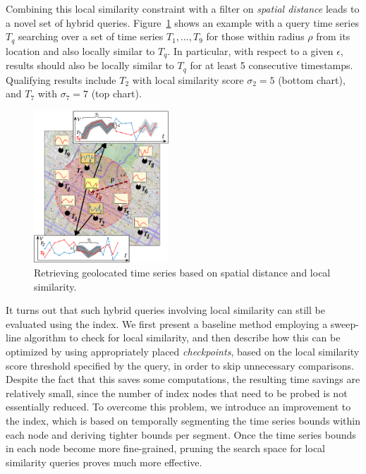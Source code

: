 Combining this local similarity constraint with a filter on {\em spatial distance} leads to a novel set of hybrid queries. Figure~\ref{fig:example_query} shows an example with a query time series $T_q$ searching over a set of time series $T_1,\dots,T_9$ for those within radius $\rho$ from its location and also locally similar to $T_q$. In particular, with respect to a given $\epsilon$, results should also be locally similar to $T_q$ for at least 5 consecutive timestamps. Qualifying results include $T_2$ with local similarity score $\sigma_2 = 5$ (bottom chart), and $T_7$ with $\sigma_7 = 7$ (top chart).

\begin{figure}[!tb]
 \centering
 \includegraphics[width=0.45\textwidth]{Figures/local_sim_geoloc.png}
\caption{Retrieving geolocated time series based on spatial distance and local similarity.}
\label{fig:example_query}
\end{figure}

It turns out that such hybrid queries involving local similarity can still be evaluated using the \btsr index. We first present a baseline method employing a sweep-line algorithm to check for local similarity, and then describe how this can be optimized by using appropriately placed {\em checkpoints}, based on the local similarity score threshold specified by the query, in order to skip unnecessary comparisons. Despite the fact that this saves some computations, the resulting time savings are relatively small, since the number of index nodes that need to be probed is not essentially reduced. To overcome this problem, we introduce an improvement to the \btsr index, which is based on temporally segmenting the time series bounds within each node and deriving tighter bounds per segment. Once the time series bounds in each node become more fine-grained, pruning the search space for local similarity queries proves much more effective.

